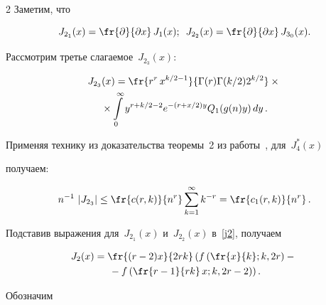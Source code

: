 \begin{multicols}{2}
Заметим, что 


$$


J_{2_1}(x) = \fr{\partial}{\partial x}\, J_1(x);\enskip 


J_{2_2}(x) = \fr{\partial}{\partial x}\, J_{3_0}(x).


$$





Рассмотрим третье сла\-га\-емое~$J_{2_3}(x)$:


\begin{multline*}


J_{2_3}(x) = \fr{r^r\,x^{k/2-1}}{\Gamma(r)\Gamma(k/2)2^{k/2}}\times{}\\


{}\times


\int\limits^{\infty}_{0} y^{r+k/2-2}


e^{-(r+x/2)y}Q_1(g(n)y)\,dy\,.


\end{multline*}





Применяя технику из доказательства теоремы~2 из работы~\cite{CMU}, для~$J^*_4(x)$ 


получаем:


$$


n^{-1}\, \left\vert J_{2_3}\right\vert \leq \fr{c(r,k)}{n^{r}} \sum\limits^{\infty}_{k=1} k^{-r}=


\fr{c_1(r,k)}{n^r}\,.


$$





Подставив выражения для~$J_{2_1}(x)$ и~$J_{2_2}(x)$ в~\eqref{j2}, получаем


\begin{multline}


\label{int2}


J_2(x) = \fr{(r-2)x}{2rk} \left(f\left(\fr{x}{k};k,2r\right) -{}\right.\\


\left.{}- f\left( 


\fr{r-1}{rk}\,x;k,2r-2\right)\right).


 \end{multline}








Обозначим


\begin{align*}



\end{align*}
\end{multicols}
